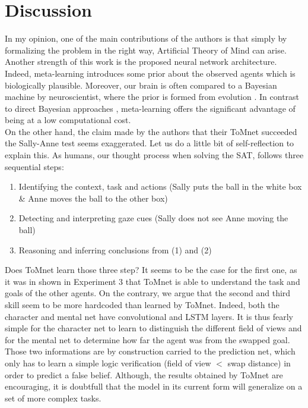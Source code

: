 \documentclass[twocolumn,superscriptaddress,aps]{revtex4-1}
\begin{document}
\section{Discussion}

\noindent In my opinion, one of the main contributions of the authors is that simply by formalizing the problem in the right way, Artificial Theory of Mind can arise. Another strength of this work is the proposed neural network architecture. Indeed, meta-learning introduces some prior about the observed agents which is biologically plausible. Moreover, our brain is often compared to a Bayesian machine by neuroscientist, where the prior is formed from evolution \cite{bayesian-brain}. In contrast to direct Bayesian approaches \cite{dragan, nature}, meta-learning offers the significant advantage of being at a low computational cost.\\

\indent On the other hand, the claim made by the authors that their ToMnet succeeded the Sally-Anne test seems exaggerated. Let us do a little bit of self-reflection to explain this. As humans, our thought process when solving the SAT, follows three sequential steps:
\begin{enumerate}[label=(\arabic*)]
\item Identifying the context, task and actions (Sally puts the ball in the white box \& Anne moves the ball to the other box)
\item Detecting and interpreting gaze cues (Sally does not see Anne moving the ball)
\item Reasoning and inferring conclusions from (1) and (2)
\end{enumerate}
Does ToMnet learn those three step? It seems to be the case for the first one, as it was in shown in Experiment 3 that ToMnet is able to understand the task and goals of the other agents. On the contrary, we argue that the second and third skill seem to be more hardcoded than learned by ToMnet. Indeed, both the character and mental net have convolutional and LSTM layers. It is thus fearly simple for the character net to learn to distinguish the different field of views and for the mental net to determine how far the agent was from the swapped goal. Those two informations are by construction carried to the prediction net, which only has to learn a simple logic verification (field of view $<$ swap distance) in order to predict a false belief. Although, the results obtained by ToMnet are encouraging, it is doubtfull that the model in its current form will generalize on a set of more complex tasks.\\
\end{document}
